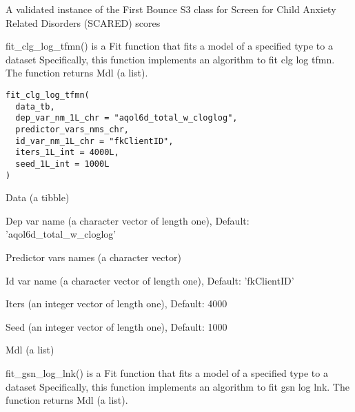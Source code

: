 \documentclass[a4paper]{book}
\begin{document}
%
\begin{Value}
A validated instance of the First Bounce S3 class for Screen for Child Anxiety Related Disorders (SCARED) scores
\end{Value}
%
\begin{Description}\relax
fit\_clg\_log\_tfmn() is a Fit function that fits a model of a specified type to a dataset Specifically, this function implements an algorithm to fit clg log tfmn. The function returns Mdl (a list).
\end{Description}
%
\begin{Usage}
\begin{verbatim}
fit_clg_log_tfmn(
  data_tb,
  dep_var_nm_1L_chr = "aqol6d_total_w_cloglog",
  predictor_vars_nms_chr,
  id_var_nm_1L_chr = "fkClientID",
  iters_1L_int = 4000L,
  seed_1L_int = 1000L
)
\end{verbatim}
\end{Usage}
%
\begin{Arguments}
\begin{ldescription}
\item[\code{data\_tb}] Data (a tibble)

\item[\code{dep\_var\_nm\_1L\_chr}] Dep var name (a character vector of length one), Default: 'aqol6d\_total\_w\_cloglog'

\item[\code{predictor\_vars\_nms\_chr}] Predictor vars names (a character vector)

\item[\code{id\_var\_nm\_1L\_chr}] Id var name (a character vector of length one), Default: 'fkClientID'

\item[\code{iters\_1L\_int}] Iters (an integer vector of length one), Default: 4000

\item[\code{seed\_1L\_int}] Seed (an integer vector of length one), Default: 1000
\end{ldescription}
\end{Arguments}
%
\begin{Value}
Mdl (a list)
\end{Value}
%
\begin{Description}\relax
fit\_gsn\_log\_lnk() is a Fit function that fits a model of a specified type to a dataset Specifically, this function implements an algorithm to fit gsn log lnk. The function returns Mdl (a list).
\end{Description}
\end{document}
